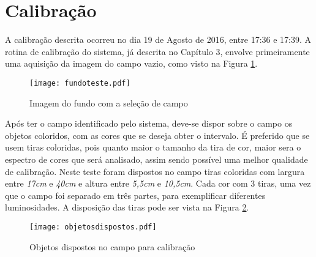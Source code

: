 \section{Calibração}
A calibração descrita ocorreu no dia 19 de Agosto de 2016, entre 17:36 e 17:39.
A rotina de calibração do sistema, já descrita no Capítulo 3, envolve primeiramente uma aquisição da imagem do campo vazio, como visto na Figura \ref{campovazio}.
\begin{figure}[H]
		\centering
		\texttt{[image: fundoteste.pdf]}
		\caption{Imagem do fundo com a seleção de campo}
		\label{campovazio}
	\end{figure}
Após ter o campo identificado pelo sistema, deve-se dispor sobre o campo os objetos coloridos, com as cores que se deseja obter o intervalo. É preferido que se usem tiras coloridas, pois quanto maior o tamanho da tira de cor, maior sera o espectro de cores que será analisado, assim sendo possível uma melhor qualidade de calibração.
Neste teste foram dispostos no campo tiras coloridas com largura entre \textit{17cm} e \textit{40cm} e altura entre \textit{5,5cm} e \textit{10,5cm}. Cada cor com 3 tiras, uma vez que o campo foi separado em três partes, para exemplificar diferentes luminosidades. A disposição das tiras pode ser vista na Figura \ref{fig:objetodispostos}.
	
	\begin{figure}[H]
\centering
\texttt{[image: objetosdispostos.pdf]}
\caption{Objetos dispostos no campo para calibração}
\label{fig:objetodispostos}
\end{figure}	
	
